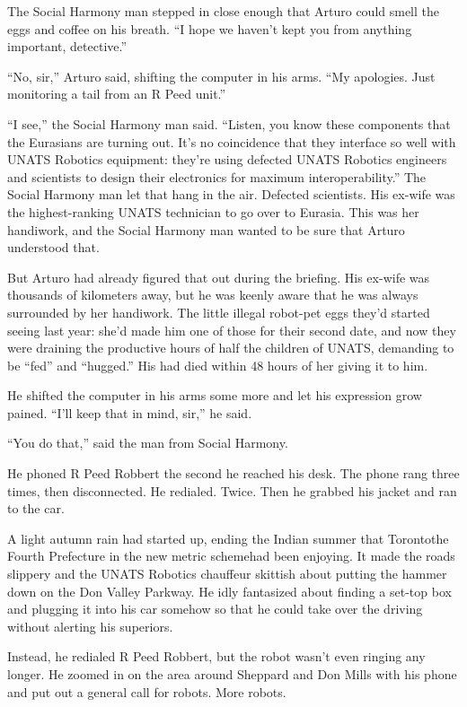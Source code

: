 The Social Harmony man stepped in close enough that Arturo could
smell the eggs and coffee on his breath. “I hope we haven’t kept
you from anything important, detective.”

“No, sir,” Arturo said, shifting the computer in his arms. “My
apologies. Just monitoring a tail from an R Peed unit.”

“I see,” the Social Harmony man said. “Listen, you know these
components that the Eurasians are turning out. It’s no coincidence
that they interface so well with UNATS Robotics equipment: they’re
using defected UNATS Robotics engineers and scientists to design
their electronics for maximum interoperability.” The Social Harmony
man let that hang in the air. Defected scientists. His ex-wife was
the highest-ranking UNATS technician to go over to Eurasia. This
was her handiwork, and the Social Harmony man wanted to be sure
that Arturo understood that.

But Arturo had already figured that out during the briefing. His
ex-wife was thousands of kilometers away, but he was keenly aware
that he was always surrounded by her handiwork. The little illegal
robot-pet eggs they’d started seeing last year: she’d made him one
of those for their second date, and now they were draining the
productive hours of half the children of UNATS, demanding to be
“fed” and “hugged.” His had died within 48 hours of her giving it
to him.

He shifted the computer in his arms some more and let his
expression grow pained. “I’ll keep that in mind, sir,” he said.

“You do that,” said the man from Social Harmony.

\tb

He phoned R Peed Robbert the second he reached his desk. The phone
rang three times, then disconnected. He redialed. Twice. Then he
grabbed his jacket and ran to the car.

A light autumn rain had started up, ending the Indian summer that
Toronto{\dash}the Fourth Prefecture in the new metric scheme{\dash}had been
enjoying. It made the roads slippery and the UNATS Robotics
chauffeur skittish about putting the hammer down on the Don Valley
Parkway. He idly fantasized about finding a set-top box and
plugging it into his car somehow so that he could take over the
driving without alerting his superiors.

Instead, he redialed R Peed Robbert, but the robot wasn’t even
ringing any longer. He zoomed in on the area around Sheppard and
Don Mills with his phone and put out a general call for robots.
More robots.

